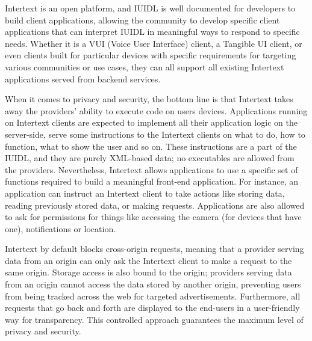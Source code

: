 Intertext is an open platform, and IUIDL is well documented for developers to build client applications, allowing the community to develop specific client applications that can interpret IUIDL in meaningful ways to respond to specific needs. Whether it is a VUI (Voice User Interface) client, a Tangible UI client, or even clients built for particular devices with specific requirements for targeting various communities or use cases, they can all support all existing Intertext applications served from backend services.  

When it comes to privacy and security, the bottom line is that Intertext takes away the providers' ability to execute code on users devices. Applications running on Intertext clients are expected to implement all their application logic on the server-side, serve some instructions to the Intertext clients on what to do, how to function, what to show the user and so on. These instructions are a part of the IUIDL, and they are purely XML-based data; no executables are allowed from the providers. Nevertheless, Intertext allows applications to use a specific set of functions required to build a meaningful front-end application. For instance, an application can instruct an Intertext client to take actions like storing data, reading previously stored data, or making requests. Applications are also allowed to ask for permissions for things like accessing the camera (for devices that have one), notifications or location. 

Intertext by default blocks cross-origin requests, meaning that a provider serving data from an origin can only ask the Intertext client to make a request to the same origin. Storage access is also bound to the origin; providers serving data from an origin cannot access the data stored by another origin, preventing users from being tracked across the web for targeted advertisements. Furthermore, all requests that go back and forth are displayed to the end-users in a user-friendly way for transparency. This controlled approach guarantees the maximum level of privacy and security.

